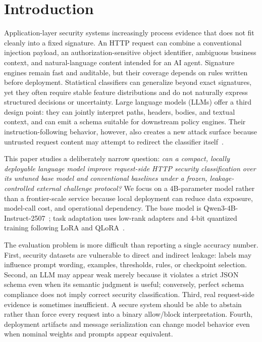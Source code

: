 \section{Introduction}
\label{sec:introduction}

Application-layer security systems increasingly process evidence that does not fit cleanly into a fixed signature. An HTTP request can combine a conventional injection payload, an authorization-sensitive object identifier, ambiguous business context, and natural-language content intended for an AI agent. Signature engines remain fast and auditable, but their coverage depends on rules written before deployment. Statistical classifiers can generalize beyond exact signatures, yet they often require stable feature distributions and do not naturally express structured decisions or uncertainty. Large language models (LLMs) offer a third design point: they can jointly interpret paths, headers, bodies, and textual context, and can emit a schema suitable for downstream policy engines. Their instruction-following behavior, however, also creates a new attack surface because untrusted request content may attempt to redirect the classifier itself~\cite{perez2022promptinject,greshake2023indirect,schulhoff2023hackaprompt}.

This paper studies a deliberately narrow question: \emph{can a compact, locally deployable language model improve request-side HTTP security classification over its untuned base model and conventional baselines under a frozen, leakage-controlled external challenge protocol?} We focus on a 4B-parameter model rather than a frontier-scale service because local deployment can reduce data exposure, model-call cost, and operational dependency. The base model is Qwen3-4B-Instruct-2507~\cite{qwen3,qwen2507}; task adaptation uses low-rank adapters and 4-bit quantized training following LoRA and QLoRA~\cite{hu2021lora,dettmers2023qlora}.

The evaluation problem is more difficult than reporting a single accuracy number. First, security datasets are vulnerable to direct and indirect leakage: labels may influence prompt wording, examples, thresholds, rules, or checkpoint selection. Second, an LLM may appear weak merely because it violates a strict JSON schema even when its semantic judgment is useful; conversely, perfect schema compliance does not imply correct security classification. Third, real request-side evidence is sometimes insufficient. A secure system should be able to abstain rather than force every request into a binary allow/block interpretation. Fourth, deployment artifacts and message serialization can change model behavior even when nominal weights and prompts appear equivalent.

